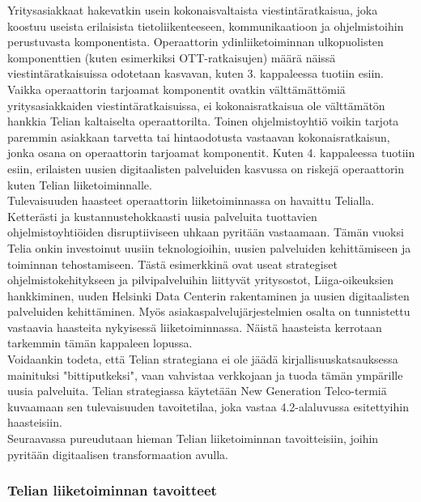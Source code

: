 \documentclass[finnish,12pt,a4paper,pdftex]{article}
\begin{document}
 \noindent Yritysasiakkaat hakevatkin usein kokonaisvaltaista viestintäratkaisua, joka koostuu useista erilaisista tietoliikenteeseen, kommunikaatioon ja ohjelmistoihin perustuvasta komponentista. Operaattorin ydinliiketoiminnan ulkopuolisten komponenttien (kuten esimerkiksi OTT-ratkaisujen) määrä näissä viestintäratkaisuissa odotetaan kasvavan, kuten 3. kappaleessa tuotiin esiin. Vaikka operaattorin tarjoamat komponentit ovatkin välttämättömiä yritysasiakkaiden viestintäratkaisuissa, ei kokonaisratkaisua ole välttämätön hankkia Telian kaltaiselta operaattorilta. Toinen ohjelmistoyhtiö voikin tarjota paremmin asiakkaan tarvetta tai hintaodotusta vastaavan kokonaisratkaisun, jonka osana on operaattorin tarjoamat komponentit. Kuten 4. kappaleessa tuotiin esiin, erilaisten uusien digitaalisten palveluiden kasvussa on riskejä operaattorin kuten Telian liiketoiminnalle.\\

Tulevaisuuden haasteet operaattorin liiketoiminnassa on havaittu Telialla. Ketterästi ja kustannustehokkaasti uusia palveluita tuottavien ohjelmistoyhtiöiden disruptiiviseen uhkaan pyritään vastaamaan.
Tämän vuoksi Telia onkin investoinut uusiin teknologioihin, uusien palveluiden kehittämiseen ja toiminnan tehostamiseen. Tästä esimerkkinä ovat useat strategiset ohjelmistokehitykseen ja pilvipalveluihin liittyvät yritysostot, Liiga-oikeuksien hankkiminen, uuden Helsinki Data Centerin rakentaminen ja uusien digitaalisten palveluiden kehittäminen. Myös asiakaspalvelujärjestelmien osalta on tunnistettu vastaavia haasteita nykyisessä liiketoiminnassa. Näistä haasteista kerrotaan tarkemmin tämän kappaleen lopussa.\\

\noindent Voidaankin todeta, että Telian strategiana ei ole jäädä kirjallisuuskatsauksessa mainituksi "bittiputkeksi", vaan vahvistaa verkkojaan ja tuoda tämän ympärille uusia palveluita. Telian strategiassa käytetään New Generation Telco-termiä kuvaamaan sen tulevaisuuden tavoitetilaa, joka vastaa 4.2-alaluvussa esitettyihin haasteisiin.\\

\noindent Seuraavassa pureudutaan hieman Telian liiketoiminnan tavoitteisiin, joihin pyritään digitaalisen transformaation avulla.

\subsubsection{Telian liiketoiminnan tavoitteet}
\end{document}
